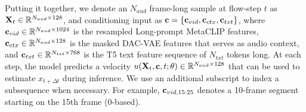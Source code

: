 Putting it together, we denote an $N_{aud}$ frame-long sample at flow-step $t$ as $\mathbf{X}_t \in \mathbb{R}^{N_{aud} \times 128}$,
and conditioning input as $\mathbf{c} = \{\mathbf{c}_{vid}, \mathbf{c}_{ctx}, \mathbf{c}_{txt}\}$,
where $\mathbf{c}_{vid} \in \mathbb{R}^{N_{aud} \times 1024}$ is the resampled Long-prompt MetaCLIP features,
$\mathbf{c}_{ctx} \in \mathbb{R}^{N_{aud} \times 128}$ is the masked DAC-VAE features that serves as audio context,
and $\mathbf{c}_{txt} \in \mathbb{R}^{N_{txt} \times 768}$ is the T5 text feature sequence of $N_{txt}$ tokens long.
At each step, the model predicts a velocity $u(\mathbf{X}_t, \mathbf{c}, t; \theta) \in \mathbb{R}^{N_{aud} \times 128}$ that can be used to estimate $x_{t+\Delta t}$ during inference.
We use an additional subscript to index a subsequence when necessary. For example, $\mathbf{c}_{vid,15:25}$ denotes a 10-frame segment starting on the 15th frame (0-based).




